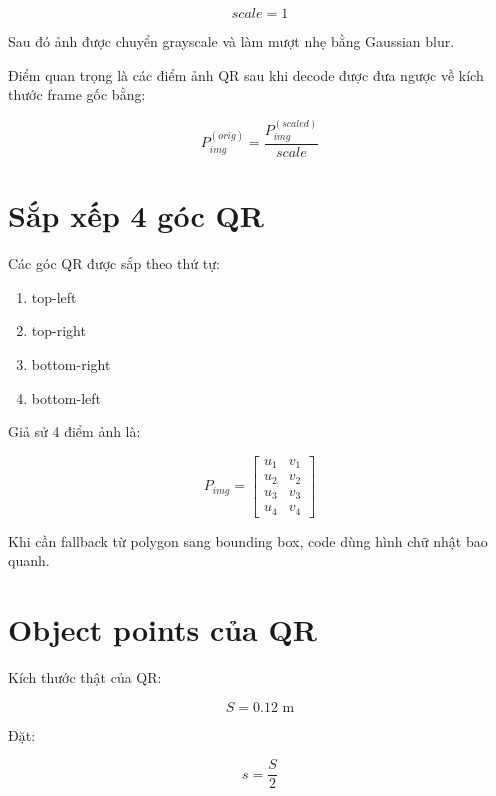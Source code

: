 \documentclass[12pt,a4paper]{article}
\begin{document}
\begin{equation}
scale = 1
\end{equation}

Sau đó ảnh được chuyển grayscale và làm mượt nhẹ bằng Gaussian blur.

Điểm quan trọng là các điểm ảnh QR sau khi decode được đưa ngược về kích thước frame gốc bằng:

\begin{equation}
P_{img}^{(orig)} = \frac{P_{img}^{(scaled)}}{scale}
\end{equation}

\section{Sắp xếp 4 góc QR}

Các góc QR được sắp theo thứ tự:

\begin{enumerate}
    \item top-left
    \item top-right
    \item bottom-right
    \item bottom-left
\end{enumerate}

Giả sử 4 điểm ảnh là:

\begin{equation}
P_{img} =
\begin{bmatrix}
u_1 & v_1 \\
u_2 & v_2 \\
u_3 & v_3 \\
u_4 & v_4
\end{bmatrix}
\end{equation}

Khi cần fallback từ polygon sang bounding box, code dùng hình chữ nhật bao quanh.

\section{Object points của QR}

Kích thước thật của QR:

\begin{equation}
S = 0.12 \text{ m}
\end{equation}

Đặt:

\begin{equation}
s = \frac{S}{2}
\end{equation}
\end{document}
